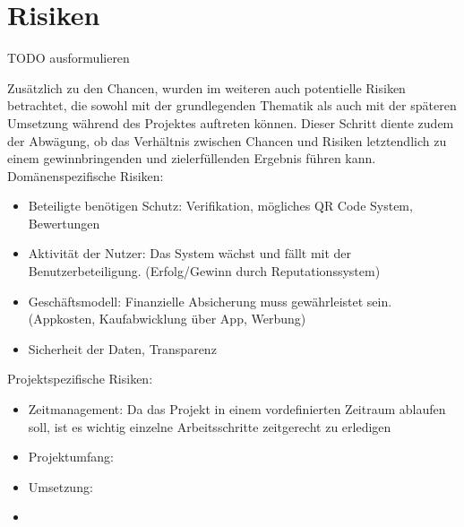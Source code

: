 
\section{Risiken}

TODO ausformulieren

Zusätzlich zu den Chancen, wurden im weiteren auch potentielle Risiken betrachtet, die sowohl mit der grundlegenden Thematik als auch mit der späteren Umsetzung während des Projektes auftreten können.
Dieser Schritt diente zudem der Abwägung, ob das Verhältnis zwischen Chancen und Risiken letztendlich zu einem gewinnbringenden und zielerfüllenden Ergebnis führen kann.\\

Domänenspezifische Risiken:
\begin{itemize}
   \item Beteiligte benötigen Schutz: Verifikation, mögliches QR Code System, Bewertungen

   \item Aktivität der Nutzer: Das System wächst und fällt mit der Benutzerbeteiligung.  (Erfolg/Gewinn durch Reputationssystem)

   \item Geschäftsmodell: Finanzielle Absicherung muss gewährleistet sein. (Appkosten, Kaufabwicklung über App, Werbung)

   \item Sicherheit der Daten, Transparenz
      
\end{itemize}
 
 Projektspezifische Risiken:
\begin{itemize}
   \item Zeitmanagement: Da das Projekt in einem vordefinierten Zeitraum ablaufen soll, ist es wichtig einzelne Arbeitsschritte zeitgerecht zu erledigen 

   \item Projektumfang: 

   \item Umsetzung:

   \item 
   

      
\end{itemize}
 